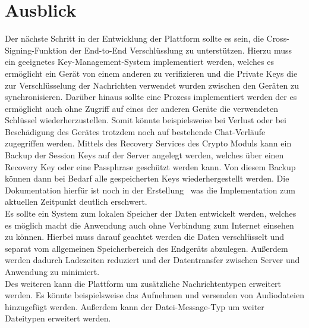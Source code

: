     \chapter{Ausblick}\label{ch:ausblick}
    Der nächste Schritt in der Entwicklung der Plattform sollte es sein, die Cross-Signing-Funktion der End-to-End Verschlüsslung zu unterstützen.
    Hierzu muss ein geeignetes Key-Management-System implementiert werden, welches es ermöglicht ein Gerät von einem anderen zu verifizieren und die Private Keys die zur Verschlüsselung der Nachrichten verwendet wurden zwischen den Geräten zu synchronisieren.
    Darüber hinaus sollte eine Prozess implementiert werden der es ermöglicht auch ohne Zugriff auf eines der anderen Geräte die verwendeten Schlüssel wiederherzustellen.
    Somit könnte beispielsweise bei Verlust oder bei Beschädigung des Gerätes trotzdem noch auf bestehende Chat-Verläufe zugegriffen werden.
    Mittels des Recovery Services des Crypto Moduls kann ein Backup der Session Keys auf der Server angelegt werden, welches über einen Recovery Key oder eine Passphrase geschützt werden kann.
    Von diesem Backup können dann bei Bedarf alle gespeicherten Keys wiederhergestellt werden.
    Die Dokumentation hierfür ist noch in der Erstellung~\cite{advancede2e} was die Implementation zum aktuellen Zeitpunkt deutlich erschwert.\\
    Es sollte ein System zum lokalen Speicher der Daten entwickelt werden, welches es möglich macht die Anwendung auch ohne Verbindung zum Internet einsehen zu können.
    Hierbei muss darauf geachtet werden die Daten verschlüsselt und separat vom allgemeinen Speicherbereich des Endgeräts abzulegen.
    Außerdem werden dadurch Ladezeiten reduziert und der Datentransfer zwischen Server und Anwendung zu minimiert.\\
    Des weiteren kann die Plattform um zusätzliche Nachrichtentypen erweitert werden.
    Es könnte beispielsweise das Aufnehmen und versenden von Audiodateien hinzugefügt werden.
    Außerdem kann der Datei-Message-Typ um weiter Dateitypen erweitert werden.

%

